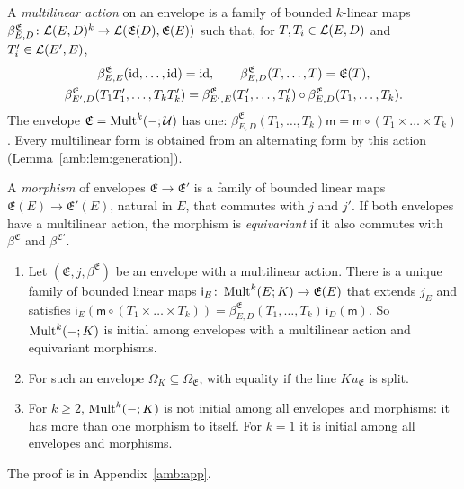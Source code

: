A \emph{multilinear action} on an envelope is a family of bounded $k$-linear maps $\beta^{\mathfrak E}_{E,D}\colon\mathcal L(E,D)^k\to\mathcal L(\mathfrak E(D),\mathfrak E(E))$ such that, for $T,T_i\in\mathcal L(E,D)$ and $T_i'\in\mathcal L(E',E)$,
\begin{equation}\label{amb:c:action}
\begin{gathered}
 \beta^{\mathfrak E}_{E,E}(\mathrm{id},\dots,\mathrm{id})=\mathrm{id},\qquad\beta^{\mathfrak E}_{E,D}(T,\dots,T)=\mathfrak E(T),\\
 \beta^{\mathfrak E}_{E',D}(T_1T_1',\dots,T_kT_k')=\beta^{\mathfrak E}_{E',E}(T_1',\dots,T_k')\circ\beta^{\mathfrak E}_{E,D}(T_1,\dots,T_k).
\end{gathered}
\end{equation}
The envelope $\mathfrak E=\operatorname{Mult}^k(-;\mathcal U)$ has one: $\beta^{\mathfrak E}_{E,D}(T_1,\dots,T_k)\mathsf m=\mathsf m\circ(T_1\times\dots\times T_k)$. Every multilinear form is obtained from an alternating form by this action (Lemma~\ref{amb:lem:generation}).

A \emph{morphism} of envelopes $\mathfrak E\to\mathfrak E'$ is a family of bounded linear maps $\mathfrak E(E)\to\mathfrak E'(E)$, natural in $E$, that commutes with $j$ and $j'$. If both envelopes have a multilinear action, the morphism is \emph{equivariant} if it also commutes with $\beta^{\mathfrak E}$ and $\beta^{\mathfrak E'}$.

\begin{theorem}\label{amb:thm:initial}
\begin{enumerate}
\item Let $(\mathfrak E,j,\beta^{\mathfrak E})$ be an envelope with a multilinear action. There is a unique family of bounded linear maps $\mathsf i_E\colon\operatorname{Mult}^k(E;K)\to\mathfrak E(E)$ that extends $j_E$ and satisfies $\mathsf i_E(\mathsf m\circ(T_1\times\dots\times T_k))=\beta^{\mathfrak E}_{E,D}(T_1,\dots,T_k)\,\mathsf i_D(\mathsf m)$. So $\operatorname{Mult}^k(-;K)$ is initial among envelopes with a multilinear action and equivariant morphisms.
\item For such an envelope $\Omega_K\subseteq\Omega_{\mathfrak E}$, with equality if the line $Ku_{\mathfrak E}$ is split.
\item For $k\ge2$, $\operatorname{Mult}^k(-;K)$ is not initial among all envelopes and morphisms: it has more than one morphism to itself. For $k=1$ it is initial among all envelopes and morphisms.
\end{enumerate}
\end{theorem}
The proof is in Appendix~\ref{amb:app}.

